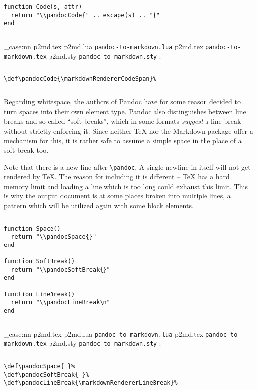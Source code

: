 \documentclass[
  digital,     %
  oneside,     %
  nosansbold,  %
  nocolorbold, %
  lof,         %
  nolot,       %
]{fithesis4}
\newcommand\macro[1]{\texttt{\textbackslash{}{#1}}}
\newcommand\pandoc[1]{\macro{pandoc\-{#1}}}
\newcommand\file[1]
  {
    \str_case:nn
      { #1 }
      {
        { p2md.lua } { \texttt{pandoc\hyp{}to\hyp{}markdown.lua} }
        { p2md.tex } { \texttt{pandoc\hyp{}to\hyp{}markdown.tex} }
        { p2md.sty } { \texttt{pandoc\hyp{}to\hyp{}markdown.sty} }
      }
  }
\begin{document}
$ $

\noindent
\lstset{language=[5.3]Lua}
\begin{lstlisting}
function Code(s, attr)
  return "\\pandocCode{" .. escape(s) .. "}"
end
\end{lstlisting}

$ $

\noindent
\file{p2md.tex}:

$ $

\noindent
\lstset{language=[plain]TeX}
\begin{lstlisting}
\def\pandocCode{\markdownRendererCodeSpan}%
\end{lstlisting}

$ $

\noindent
Regarding whitespace, the authors of Pandoc have for some reason decided to turn spaces into their own element type. Pandoc also distinguishes between line breaks and so-called ``soft breaks'', which in some formats \textit{suggest} a line break without strictly enforcing it. Since neither \TeX{} nor the Markdown package offer a mechanism for this, it is rather safe to assume a simple space in the place of a soft break too.

Note that there is a new line after \pandoc{LineBreak}. A single newline in itself will not get rendered by \TeX{}. The reason for including it is different -- \TeX{} has a hard memory limit and loading a line which is too long could exhaust this limit. This is why the output document is at some places broken into multiple lines, a pattern which will be utilized again with some block elements.

$ $

\noindent
\lstset{language=[5.3]Lua}
\begin{lstlisting}
function Space()
  return "\\pandocSpace{}"
end

function SoftBreak()
  return "\\pandocSoftBreak{}"
end

function LineBreak()
  return "\\pandocLineBreak\n"
end
\end{lstlisting}

$ $

\noindent
\file{p2md.tex}:

$ $

\noindent
\lstset{language=[plain]TeX}
\begin{lstlisting}
\def\pandocSpace{ }%
\def\pandocSoftBreak{ }%
\def\pandocLineBreak{\markdownRendererLineBreak}%
\end{lstlisting}
\end{document}
